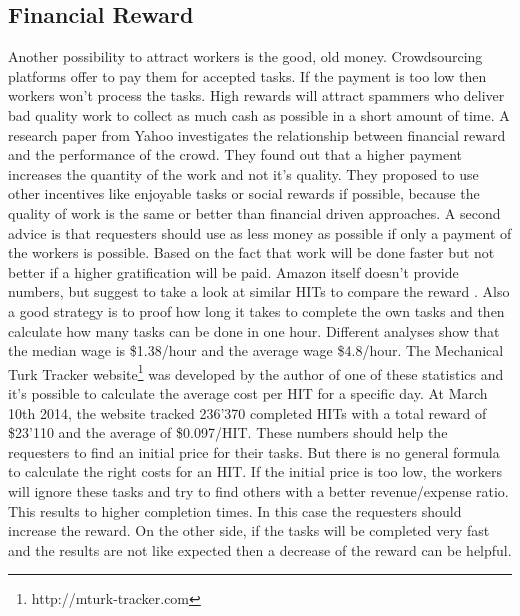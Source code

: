 \subsection{Financial Reward}
Another possibility to attract workers is the good, old money. Crowdsourcing platforms offer to pay them for accepted tasks. If the payment is too low then workers won't process the tasks. High rewards will attract spammers who deliver bad quality work to collect as much cash as possible in a short amount of time. A research paper from Yahoo \cite{mason} investigates the relationship between financial reward and the performance of the crowd. They found out that a higher payment increases the quantity of the work and not it's quality. They proposed to use other incentives like enjoyable tasks or social rewards if possible, because the quality of work is the same or better than financial driven approaches. A second advice is that requesters should use as less money as possible if only a payment of the workers is possible. Based on the fact that work will be done faster but not better if a higher gratification will be paid. 
Amazon itself doesn't provide numbers, but suggest to take a look at similar HITs to compare the reward \cite{mturk_bestpractices}. Also a good strategy is to proof how long it takes to complete the own tasks and then calculate how many tasks can be done in one hour. Different analyses \cite{chilton,ipeirotis} show that the median wage is \$1.38/hour and the average wage \$4.8/hour. The Mechanical Turk Tracker website\footnote{http://mturk-tracker.com} was developed by the author of one of these statistics \cite{ipeirotis} and it's possible to calculate the average cost per HIT for a specific day. At March 10th 2014, the website tracked 236'370 completed HITs with a total reward of \$23'110 and the average of \$0.097/HIT. These numbers should help the requesters to find an initial price for their tasks. But there is no general formula to calculate the right costs for an HIT. If the initial price is too low, the workers will ignore these tasks and try to find others with a better revenue/expense ratio. This results to higher completion times. In this case the requesters should increase the reward. On the other side, if the tasks will be completed very fast and the results are not like expected then a decrease of the reward can be helpful.

